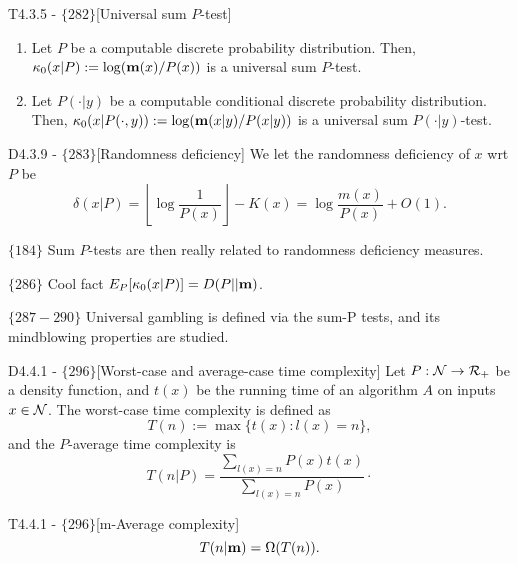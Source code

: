 \documentclass{article}
\begin{document}
\begin{flexitheorem}{T4.3.5 - $\{282\}$}[Universal sum $P$-test]
    \begin{enumerate}[label = (\roman*)]
        \item Let $P$ be a computable discrete probability distribution. Then, $\kappa_0(x|P) := \log({\bf m}(x)/P(x))$ is a universal sum $P$-test.
        \item Let $P(\cdot|y)$ be a computable conditional discrete probability distribution. Then, $\kappa_0(x|P(\cdot,y)) := \log({\bf m}(x|y)/P(x|y))$ is a universal sum $P(\cdot|y)$-test.
    \end{enumerate}
\end{flexitheorem}

\begin{flexidefinition}{D4.3.9 - $\{283\}$}[Randomness deficiency]
    We let the randomness deficiency of $x$ wrt $P$ be
    \begin{equation}
        \delta(x|P) = \left\lfloor \log \frac{1}{P(x)} \right\rfloor - K(x) = \log \frac{m(x)}{P(x)} + O(1).
    \end{equation}
\end{flexidefinition}

$\{184\}$ Sum $P$-tests are then really related to randomness deficiency measures.

$\{286\}$ Cool fact $E_P[\kappa_0(x|P)] = D(P || {\bf m})$.

$\{287-290\}$ Universal gambling is defined via the sum-P tests, and its mindblowing properties are studied.

\begin{flexidefinition}{D4.4.1 - $\{296\}$}[Worst-case and average-case time complexity]
Let $P : \mathcal{N} \to \mathcal{R}_+$ be a density function, and $t(x)$ be the running time of an algorithm $A$ on inputs $x \in \mathcal{N}$. The worst-case time complexity is defined as
\begin{equation}
    T(n) := \max \{t(x): l(x) = n \},
\end{equation}
and the $P$-average time complexity is 
\begin{equation}
    T(n|P) = \frac{\sum_{l(x)=n} P(x) t(x)}{\sum_{l(x)=n} P(x)}\cdot
\end{equation}
\end{flexidefinition}
\begin{flexitheorem}{T4.4.1 - $\{296\}$}[m-Average complexity]
    \begin{equation}
        T(n|{\bf m}) = \Omega(T(n)).
    \end{equation}
\end{flexitheorem}
\end{document}
